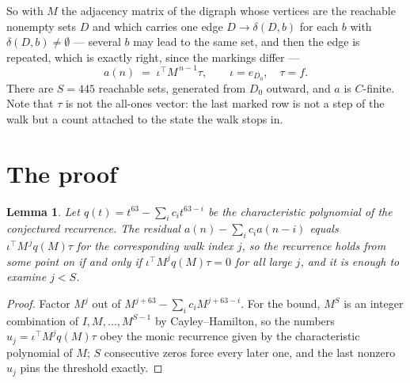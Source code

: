 \documentclass[11pt,a4paper]{article}
\theoremstyle{plain}
\newtheorem{lemma}[theorem]{Lemma}
\theoremstyle{definition}
\begin{document}
So with $M$ the adjacency matrix of the digraph whose vertices are the reachable nonempty sets
$D$ and which carries one edge $D\to\delta(D,b)$ for each $b$ with $\delta(D,b)\neq\emptyset$
--- several $b$ may lead to the same set, and then the edge is repeated, which is exactly
right, since the markings differ ---
\[
a(n)\;=\;\iota^{\!\top}M^{\,n-1}\tau,\qquad \iota=e_{D_0},\quad \tau=f .
\]
There are $S=445$ reachable sets, generated from $D_0$ outward, and $a$ is $C$-finite. Note
that $\tau$ is not the all-ones vector: the last marked row is not a step of the walk but a
count attached to the state the walk stops in.

\section{The proof}

\begin{lemma}\label{lem:crit}
Let $q(t)=t^{63}-\sum_i c_it^{63-i}$ be the characteristic polynomial of the
conjectured recurrence. The residual $a(n)-\sum_ic_ia(n-i)$ equals
$\iota^{\!\top}M^{\,j}q(M)\tau$ for the corresponding walk index $j$, so the recurrence
holds from some point on if and only if $\iota^{\!\top}M^{j}q(M)\tau=0$ for all large $j$,
and it is enough to examine $j<S$.
\end{lemma}

\begin{proof}
Factor $M^{j}$ out of $M^{j+63}-\sum_ic_iM^{j+63-i}$. For the bound, $M^{S}$
is an integer combination of $I,M,\dots,M^{S-1}$ by Cayley--Hamilton, so the numbers
$u_j=\iota^{\!\top}M^{j}q(M)\tau$ obey the monic recurrence given by the characteristic
polynomial of $M$; $S$ consecutive zeros force every later one, and the last nonzero $u_j$
pins the threshold exactly.
\end{proof}
\end{document}
